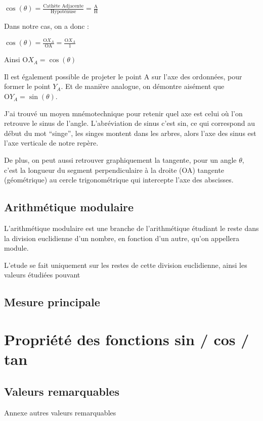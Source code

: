 \documentclass[a4paper]{article}
\begin{document}
			$\cos(\theta) = \frac{\text{Cathète Adjacente}}{\text{Hypoténuse}} = \frac{\text{A}}{\text{H}}$

			Dans notre cas, on a donc :

			$\cos(\theta) = \frac{\text{O}X_A}{\text{OA}} = \frac{\text{O}X_A}{1}$

			Ainsi $\text{O}X_A = \cos(\theta)$

			Il est également possible de projeter le point A sur l'axe des ordonnées, pour former le point $Y_A$. Et de manière analogue, on démontre aisément que $\text{O}Y_A = \sin(\theta)$.

			J'ai trouvé un moyen mnémotechnique pour retenir quel axe est celui où l'on retrouve le sinus de l'angle. L'abréviation de sinus c'est sin, ce qui correspond au début du mot “singe”, les singes montent dans les arbres, alors l'axe des sinus est l'axe verticale de notre repère.

			De plus, on peut aussi retrouver graphiquement la tangente, pour un angle $\theta$, c'est la longueur du segment perpendiculaire à la droite (OA) tangente (géométrique) au cercle trigonométrique qui intercepte l'axe des abscisses.

		\subsection{Arithmétique modulaire}

			L'arithmétique modulaire est une branche de l'arithmétique étudiant le reste dans la division euclidienne d'un nombre, en fonction d'un autre, qu'on appellera module. 

			L'etude se fait uniquement sur les restes de cette division euclidienne, ainsi les valeurs étudiées pouvant 

		\subsection{Mesure principale}

	\section{Propriété des fonctions sin / cos / tan}

		\subsection{Valeurs remarquables}

			Annexe autres valeurs remarquables 
\end{document}
